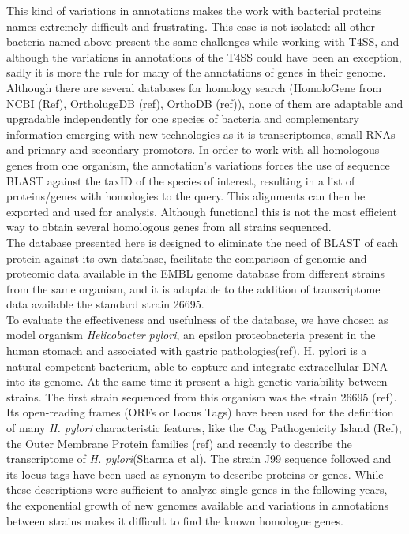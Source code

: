 \documentclass[a4,center,fleqn]{NAR}
\begin{document}
This kind of variations in annotations makes the work with bacterial proteins names extremely difficult and frustrating. This case is not isolated: all other bacteria named above present the same challenges while working with T4SS, and although the variations in annotations of the T4SS could have been an exception, sadly it is more the rule for many of the annotations of genes in their genome.\\
Although there are several databases for homology search (HomoloGene from NCBI (Ref), OrtholugeDB (ref), OrthoDB (ref)), none of them are adaptable and upgradable independently for one species of bacteria and complementary information emerging with new technologies as it is transcriptomes, small RNAs and primary and secondary promotors. 
In order to work with all homologous genes from one organism, the annotation's variations forces the use of sequence BLAST against the taxID of the species of interest, resulting in a list of proteins/genes with homologies to the query. This alignments can then be exported and used for analysis. Although functional this is not the most efficient way to obtain several homologous genes from all strains sequenced.\\The database presented here is designed to eliminate the need of BLAST of each protein against its own database, facilitate the comparison of genomic and proteomic data available in the EMBL genome database from different strains from the same organism, and it is adaptable to the addition of transcriptome data available the standard strain 26695. \\
To evaluate the effectiveness and usefulness of the database, we have chosen as model organism \textit{Helicobacter pylori}, an epsilon proteobacteria present in the human stomach and associated with gastric pathologies(ref). H. pylori is a natural competent bacterium, able to capture and integrate extracellular DNA into its genome. At the same time it present a high genetic variability between strains. The first strain sequenced from this organism was the strain 26695 (ref). Its open-reading frames (ORFs or Locus Tags) have been used for the definition of many  \textit{H. pylori} characteristic features, like the Cag Pathogenicity Island (Ref), the Outer Membrane Protein families (ref) and recently to describe the transcriptome of \textit{H. pylori}(Sharma et al). The strain J99 sequence followed and its locus tags have been used as synonym to describe proteins or genes. While these descriptions were sufficient to analyze single genes in the following years, the exponential growth of new genomes available and variations in annotations between strains makes it difficult to find the known homologue genes.
\end{document}
